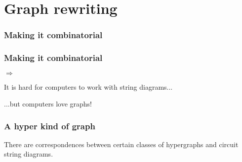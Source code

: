 \section{Graph rewriting}

\begin{frame}
    \frametitle{Making it combinatorial}

    \LARGE
    \centering


\end{frame}

\begin{frame}
    \frametitle{Making it combinatorial}

    \centering

    \await

    \Large
    \await
    \(\Rightarrow\)

    \await

    \vspace{1.5em}

    It is \alert{hard} for computers to work with string diagrams...

    \await

    ...but computers \alert{love} graphs!

\end{frame}

\begin{frame}
    \frametitle{A hyper kind of graph}

    \centering


    \vspace{1em}

    \await
    \Large

    There are correspondences between \alert{certain classes of hypergraphs} and
    \alert{circuit string diagrams}.

    \await
    \normalsize
    \vspace{1em}


\end{frame}

